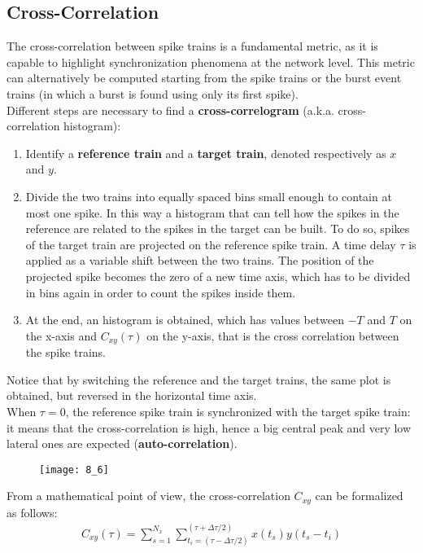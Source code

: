 \subsection{Cross-Correlation}
The cross-correlation between spike trains is a fundamental metric, as it is capable
to highlight synchronization phenomena at the network level. This metric
can alternatively be computed starting from the spike trains or the burst event trains
(in which a burst is found using only its first spike).\\
Different steps are necessary to find a \textbf{cross-correlogram}
(a.k.a. cross-correlation histogram):
\begin{enumerate}
    \item Identify a \textbf{reference train} and a \textbf{target train}, denoted
          respectively as \(x\) and \(y\).
    \item Divide the two trains into equally spaced bins small enough to contain at most
          one spike. In this way a histogram that can tell how the spikes in the reference are
          related to the spikes in the target can be built. To do so, spikes of the target train
          are projected on the reference spike train. A time delay \(\tau\) is applied as a
          variable shift between the two trains. The position of the projected spike becomes the
          zero of a new time axis, which has to be divided in bins again in order to count the
          spikes inside them.
    \item At the end, an histogram is obtained, which has values between \(-T\) and \(T\) on
          the x-axis and \(C_{xy}(\tau)\) on the y-axis, that is the cross correlation between
          the spike trains.
\end{enumerate}
Notice that by switching the reference and the target trains, the same plot is obtained,
but reversed in the horizontal time axis.\\
When \(\tau = 0\), the reference spike train is synchronized with the target spike train:
it means that the cross-correlation is high, hence a big central peak and very low lateral
ones are expected (\textbf{auto-correlation}).
\begin{figure}[H]
    \texttt{[image: 8\_6]}
    \centering
\end{figure}
From a mathematical point of view, the cross-correlation \(C_{xy}\) can be formalized
as follows:
\begin{align*}
    C_{xy}(\tau)
    =\sum_{s=1}^{N_x}\sum_{t_{i}=(\tau-\Delta{\tau}/2)}^{(\tau+\Delta{\tau}/2)}x(t_s)y(t_s-t_i)
\end{align*}
